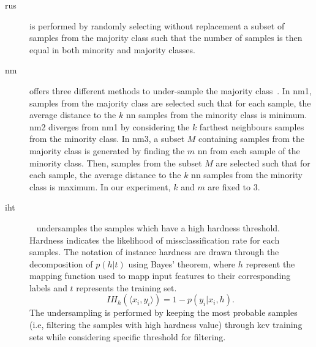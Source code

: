 \begin{description}
  \item[\Ac{rus}] is performed by randomly selecting without replacement a subset of samples from the majority class such that the number of samples is then equal in both minority and majority classes.
  \item[\Ac{nm}] offers three different methods to under-sample the majority class~\cite{mani2003knn}.
In \ac{nm1}, samples from the majority class are selected such that for each sample, the average distance to the $k$ \ac{nn} samples from the minority class is minimum.
\ac{nm2} diverges from \ac{nm1} by considering the $k$ farthest neighbours samples from the minority class.
In \ac{nm3}, a subset $M$ containing samples from the majority class is generated by finding the $m$ \ac{nn} from each sample of the minority class.
Then, samples from the subset $M$ are selected such that for each sample, the average distance to the $k$ \ac{nn} samples from the minority class is maximum.
In our experiment, $k$ and $m$ are fixed to 3.
\item[\Ac{iht}]~\cite{smith2014instance} undersamples the samples which have a high hardness threshold.
Hardness indicates the likelihood of missclassification rate for each samples.
The notation of instance hardness are drawn through the decomposition of $p(h \vert t)$ using Bayes' theorem, where $h$ represent the mapping function used to mapp input features to their corresponding labels and $t$ represents the training set.
\begin{equation}
  IH_h(\langle x_{i}, y_{i}\rangle) = 1 - p(y_i \vert x_i, h).\
\label{eq:iht}
\end{equation}
The undersampling is performed by keeping the most probable samples (i.e, filtering the samples with high hardness value) through \ac{kcv} training sets while considering specific threshold for filtering.

 
\end{description}

